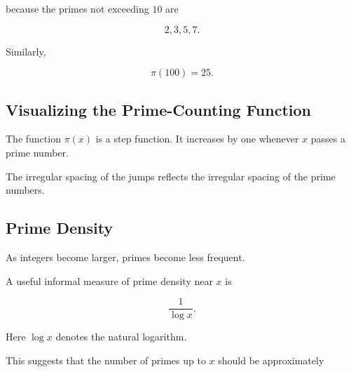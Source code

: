 because the primes not exceeding \(10\) are

\[ 2,3,5,7. \]

Similarly,

\[ \pi(100)=25. \]

\subsection{Visualizing the Prime-Counting Function}
\label{subsec:visualizing-prime-counting}

The function \(\pi(x)\) is a step function. It increases by one whenever
\(x\) passes a prime number.

\begin{centereddiagram}
\end{centereddiagram}

The irregular spacing of the jumps reflects the irregular spacing of the
prime numbers.

\subsection{Prime Density}
\label{subsec:prime-density}

As integers become larger, primes become less frequent.

A useful informal measure of prime density near \(x\) is

\[ \frac{1}{\log x}. \]

Here \(\log x\) denotes the natural logarithm.

This suggests that the number of primes up to \(x\) should be approximately

